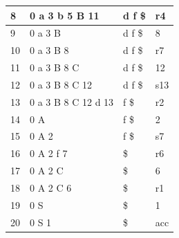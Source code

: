 \documentclass{article}
\begin{document}
\begin{latin}
\begin{table}[H]
\begin{tabular}{|llll|}
\multicolumn{1}{|l|}{8}             & \multicolumn{1}{l|}{{\color[HTML]{0000FF} 0 a 3 b 5 B 11}}      & \multicolumn{1}{l|}{d f \$}         & r4                                   \\ \hline
\multicolumn{1}{|l|}{9}             & \multicolumn{1}{l|}{{\color[HTML]{0000FF} 0 a 3 B}}             & \multicolumn{1}{l|}{d f \$}         & {\color[HTML]{0000FF} 8}             \\ \hline
\multicolumn{1}{|l|}{10}            & \multicolumn{1}{l|}{{\color[HTML]{0000FF} 0 a 3 B 8}}           & \multicolumn{1}{l|}{d f \$}         & r7                                   \\ \hline
\multicolumn{1}{|l|}{11}            & \multicolumn{1}{l|}{{\color[HTML]{0000FF} 0 a 3 B 8 C}}         & \multicolumn{1}{l|}{d f \$}         & {\color[HTML]{0000FF} 12}            \\ \hline
\multicolumn{1}{|l|}{12}            & \multicolumn{1}{l|}{{\color[HTML]{0000FF} 0 a 3 B 8 C 12}}      & \multicolumn{1}{l|}{d f \$}         & s13                                  \\ \hline
\multicolumn{1}{|l|}{13}            & \multicolumn{1}{l|}{{\color[HTML]{0000FF} 0 a 3 B 8 C 12 d 13}} & \multicolumn{1}{l|}{f \$}           & r2                                   \\ \hline
\multicolumn{1}{|l|}{14}            & \multicolumn{1}{l|}{{\color[HTML]{0000FF} 0 A}}                 & \multicolumn{1}{l|}{f \$}           & {\color[HTML]{0000FF} 2}             \\ \hline
\multicolumn{1}{|l|}{15}            & \multicolumn{1}{l|}{{\color[HTML]{0000FF} 0 A 2}}               & \multicolumn{1}{l|}{f \$}           & s7                                   \\ \hline
\multicolumn{1}{|l|}{16}            & \multicolumn{1}{l|}{{\color[HTML]{0000FF} 0 A 2 f 7}}           & \multicolumn{1}{l|}{\$}             & r6                                   \\ \hline
\multicolumn{1}{|l|}{17}            & \multicolumn{1}{l|}{{\color[HTML]{0000FF} 0 A 2 C}}             & \multicolumn{1}{l|}{\$}             & {\color[HTML]{0000FF} 6}             \\ \hline
\multicolumn{1}{|l|}{18}            & \multicolumn{1}{l|}{{\color[HTML]{0000FF} 0 A 2 C 6}}           & \multicolumn{1}{l|}{\$}             & r1                                   \\ \hline
\multicolumn{1}{|l|}{19}            & \multicolumn{1}{l|}{{\color[HTML]{0000FF} 0 S}}                 & \multicolumn{1}{l|}{\$}             & {\color[HTML]{0000FF} 1}             \\ \hline
\multicolumn{1}{|l|}{20}            & \multicolumn{1}{l|}{{\color[HTML]{0000FF} 0 S 1}}               & \multicolumn{1}{l|}{\$}             & {\color[HTML]{008000} acc}           \\ \hline
\end{tabular}
\end{table}
\end{latin}
\end{document}
